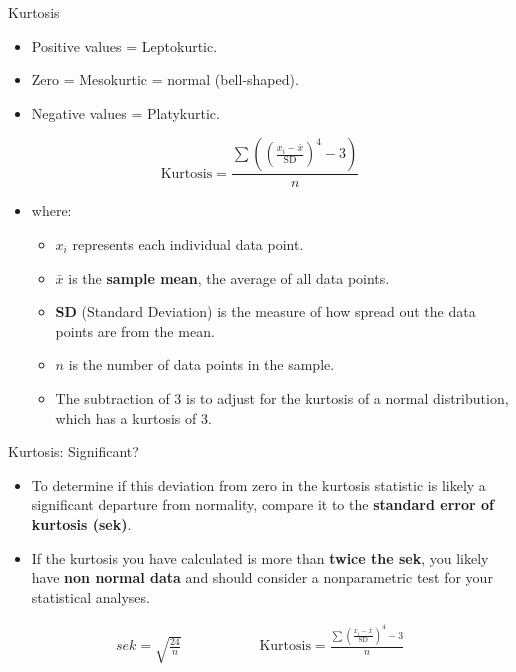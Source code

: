 \documentclass[
  ignorenonframetext,
]{beamer}
\providecommand{\tightlist}{%
  \setlength{\itemsep}{0pt}\setlength{\parskip}{0pt}}
\begin{document}
\begin{frame}{Kurtosis}
\label{kurtosis-1}
\begin{itemize}
\tightlist
\item
  Positive values = Leptokurtic.
\end{itemize}

\begin{itemize}
\tightlist
\item
  Zero = Mesokurtic = normal (bell-shaped).
\end{itemize}

\begin{itemize}
\tightlist
\item
  Negative values = Platykurtic.
\end{itemize}

\[
\text{Kurtosis} = \frac{\sum(\left( \frac{x_i - \bar{x}}{\text{SD}} \right)^4 - 3)}{n}
\]

\begin{itemize}
\tightlist
\item
  where:

  \begin{itemize}
  \tightlist
  \item
    \(x_i\) represents each individual data point.
  \item
    \(\bar{x}\) is the \textbf{sample mean}, the average of all data
    points.
  \item
    \textbf{SD} (Standard Deviation) is the measure of how spread out
    the data points are from the mean.
  \item
    \(n\) is the number of data points in the sample.
  \item
    The subtraction of 3 is to adjust for the kurtosis of a normal
    distribution, which has a kurtosis of 3.
  \end{itemize}
\end{itemize}
\end{frame}

\begin{frame}{Kurtosis: Significant?}
\label{kurtosis-significant}
\begin{itemize}
\item
  To determine if this deviation from zero in the kurtosis statistic is
  likely a significant departure from normality, compare it to the
  \textbf{standard error of kurtosis (sek)}.
\item
  If the kurtosis you have calculated is more than \textbf{twice the
  sek}, you likely have \textbf{non normal data} and should consider a
  nonparametric test for your statistical analyses.
\end{itemize}

\[
\begin{array}{cc}
sek = \sqrt{\frac{24}{n}} & \hspace{2cm} \text{Kurtosis} = \frac{\sum \left( \frac{x_i - \bar{x}}{\text{SD}} \right)^4 - 3}{n}
\end{array}
\]
\end{frame}
\end{document}
